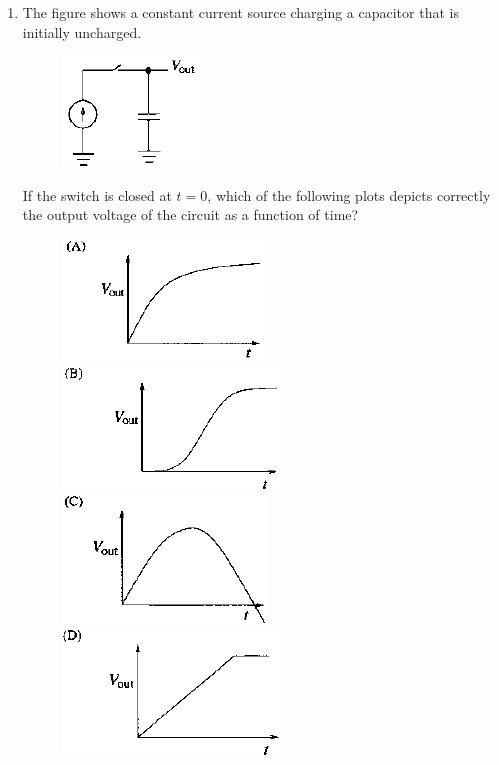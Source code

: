 \documentclass[journal,12pt,onecolumn]{IEEEtran}
\theoremstyle{remark}
\begin{document}
\begin{enumerate}
\item The figure shows a constant current source charging a capacitor that is initially uncharged.
	\begin{figure}[H] \centering
		\caption*{} \label{fig:40} \includegraphics[width=0.3\columnwidth]{figs/40.png}
	\end{figure}
	If the switch is closed at $t=0$, which of the following plots depicts correctly the output voltage of the circuit as a function of time?\hfill{}
	\begin{figure}[H]
		\centering
		\caption*{} \label{fig:40a} \includegraphics[width=0.45\columnwidth]{figs/40a.png}
		\caption*{} \label{fig:40b} \includegraphics[width=0.45\columnwidth]{figs/40b.png}
		\caption*{} \label{fig:40c} \includegraphics[width=0.45\columnwidth]{figs/40c.png}
		\caption*{} \label{fig:40d} \includegraphics[width=0.45\columnwidth]{figs/40d.png}
	\end{figure}



\end{enumerate}
\end{document}
